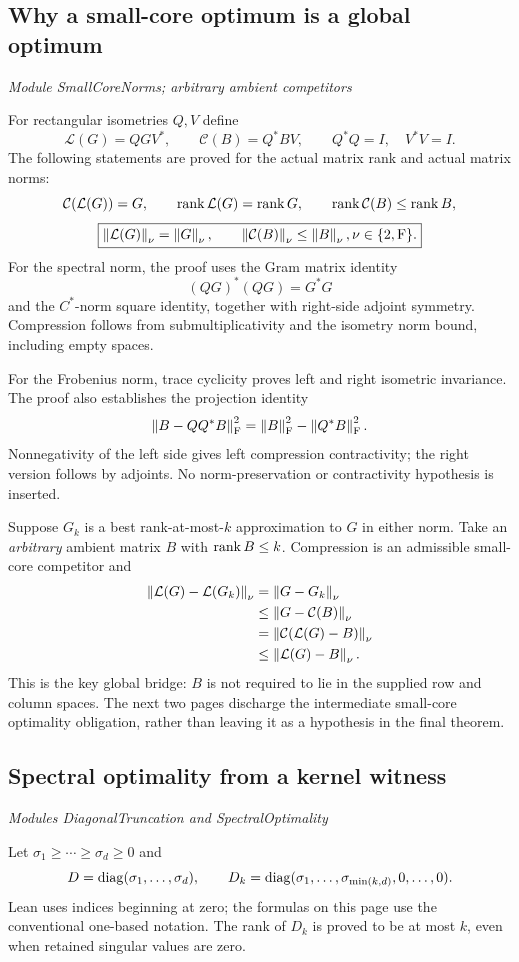 \subsection{Why a small-core optimum is a global optimum}\label{supp6:subsection:002}\textit{Module SmallCoreNorms; arbitrary ambient competitors}\par
For rectangular isometries $Q,V$ define
\[
\mathcal L(G)=QGV^*,\qquad \mathcal C(B)=Q^*BV,
\qquad Q^*Q=I,\quad V^*V=I.
\]
The following statements are proved for the actual matrix rank and actual matrix norms:
\[
\mathcal C(\mathcal L(G))=G,
\qquad \rank\mathcal L(G)=\rank G,
\qquad \rank\mathcal C(B)\leq\rank B,
\]
\[
\boxed{\norm{\mathcal L(G)}_\nu=\norm{G}_\nu,
\qquad \norm{\mathcal C(B)}_\nu\leq\norm B_\nu,
\quad \nu\in\{2,\mathrm F\}.}
\]
For the spectral norm, the proof uses the Gram matrix identity
\[
(QG)^*(QG)=G^*G
\]
and the $C^*$-norm square identity, together with right-side adjoint symmetry. Compression follows from submultiplicativity and the isometry norm bound, including empty spaces.

For the Frobenius norm, trace cyclicity proves left and right isometric invariance. The proof also establishes the projection identity
\[
\norm{B-QQ^*B}_{\mathrm F}^{2}
=\norm B_{\mathrm F}^{2}-\norm{Q^*B}_{\mathrm F}^{2}.
\]
Nonnegativity of the left side gives left compression contractivity; the right version follows by adjoints. No norm-preservation or contractivity hypothesis is inserted.

Suppose $G_k$ is a best rank-at-most-$k$ approximation to $G$ in either norm. Take an \emph{arbitrary} ambient matrix $B$ with $\operatorname{rank} B\leq k$. Compression is an admissible small-core competitor and
\[
\begin{aligned}
\norm{\mathcal L(G)-\mathcal L(G_k)}_\nu
&=\norm{G-G_k}_\nu\\
&\leq\norm{G-\mathcal C(B)}_\nu\\
&=\norm{\mathcal C(\mathcal L(G)-B)}_\nu\\
&\leq\norm{\mathcal L(G)-B}_\nu.
\end{aligned}
\]
This is the key global bridge: $B$ is not required to lie in the supplied row and column spaces. The next two pages discharge the intermediate small-core optimality obligation, rather than leaving it as a hypothesis in the final theorem.



\subsection{Spectral optimality from a kernel witness}\label{supp6:subsection:003}\textit{Modules DiagonalTruncation and SpectralOptimality}\par
Let $\sigma_1\geq\cdots\geq\sigma_d\geq0$ and
\[
D=\operatorname{diag}(\sigma_1,\ldots,\sigma_d),\qquad
D_k=\operatorname{diag}(\sigma_1,\ldots,\sigma_{\min(k,d)},0,\ldots,0).
\]
Lean uses indices beginning at zero; the formulas on this page use the conventional one-based notation. The rank of $D_k$ is proved to be at most $k$, even when retained singular values are zero.

